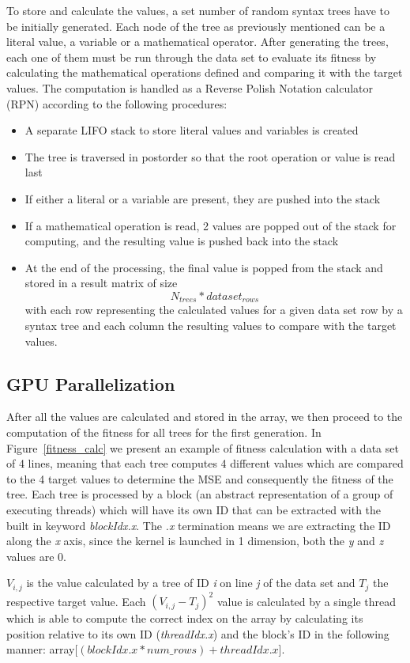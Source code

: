 \documentclass[runningheads]{llncs}
\begin{document}
To store and calculate the values, a set number of random syntax trees have to be initially generated. Each node of the tree as previously mentioned can be a literal value, a variable or a mathematical operator. After generating the trees, each one of them must be run through the data set to evaluate its fitness by calculating the mathematical operations defined and comparing it with the target values. The computation is handled as a Reverse Polish Notation calculator (RPN) according to the following procedures:
\begin{itemize}
	\item A separate LIFO stack to store literal values and variables is created
	\item The tree is traversed in postorder so that the root operation or value is read last
	\item If either a literal or a variable are present, they are pushed into the stack
	\item If a mathematical operation is read, 2 values are popped out of the stack for computing, and the resulting value is pushed back into the stack
	\item At the end of the processing, the final value is popped from the stack and stored in a result matrix of size $$N_{trees}*dataset_{rows}$$ with each row representing the calculated values for a given data set row by a syntax tree and each column the resulting values to compare with the target values.
\end{itemize}

\subsection{GPU Parallelization}
After all the values are calculated and stored in the array, we then proceed to the computation of the fitness for all trees for the first generation. In Figure~\ref{fitness_calc} we present an example of fitness calculation with a data set of 4 lines, meaning that each tree computes 4 different values which are compared to the 4 target values to determine the MSE and consequently the fitness of the tree. Each tree is processed by a block (an abstract representation of a group of executing threads) which will have its own ID that can be extracted with the built in keyword \textit{blockIdx.x}. The \textit{.x} termination means we are extracting the ID along the \textit{x} axis, since the kernel is launched in 1 dimension, both the \textit{y} and \textit{z} values are 0.

$V_{i,j}$ is the value calculated by a tree of ID \textit{i} on line \textit{j} of the data set and $T_{j}$ the respective target value. Each $(V_{i,j} - T_{j})^{2}$ value is calculated by a single thread which is able to compute the correct index on the array by calculating its position relative to its own ID (\textit{threadIdx.x}) and the block's ID in the following manner: array[$(blockIdx.x * num\_rows) + threadIdx.x$].
\end{document}
